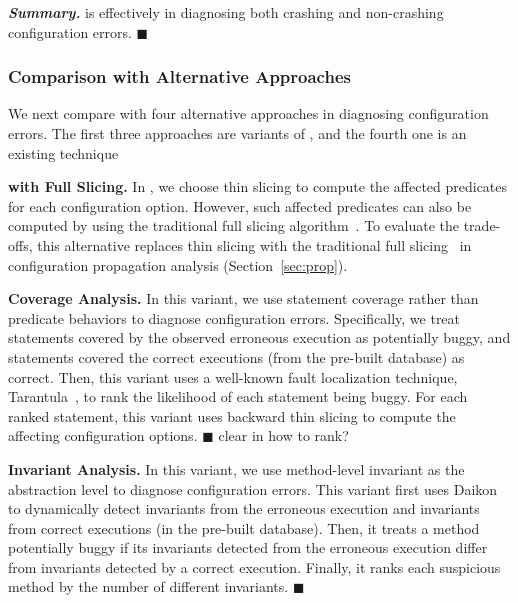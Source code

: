 \vspace{1mm}
\noindent \textbf{\textit{Summary.}} \ourtool is effectively
in diagnosing both crashing and non-crashing configuration errors. $\blacksquare$


\subsubsection{Comparison with Alternative Approaches}
\label{sec:comparison}

We next compare \ourtool with four alternative approaches
in diagnosing configuration errors.
The first three approaches are variants of \ourtool,
and the fourth one is an existing technique~\cite{Rabkin:2011:PPC}

\vspace{1mm}
\noindent \textbf{\ourtool with Full Slicing.} 
In \ourtool, we choose thin slicing to compute the affected predicates for
each configuration option. However, such affected predicates
can also be computed by using the traditional full slicing algorithm~\cite{Horwitz:1988}.
To evaluate the trade-offs, this alternative replaces
thin slicing with the traditional
full slicing~\cite{Horwitz:1988} in configuration
propagation analysis (Section~\ref{sec:prop}).

\vspace{1mm}
\noindent \textbf{Coverage Analysis.}
In this variant, we use statement coverage rather than
predicate behaviors to diagnose configuration errors. Specifically,
we treat statements covered by the observed erroneous execution as
potentially buggy, and statements covered the correct executions (from
the pre-built database) as correct. Then, this variant uses
a well-known fault localization technique, Tarantula~\cite{Jones:2002},
to rank the likelihood of each statement being buggy.
For each ranked statement, this variant uses backward thin slicing
to compute the affecting configuration options. $\blacksquare$ clear in
how to rank?


\vspace{1mm}
\noindent \textbf{Invariant Analysis.}
In this variant, we use method-level invariant as the abstraction level
to diagnose configuration errors. This variant first uses
Daikon~\cite{Ernst:1999} to dynamically
detect invariants from the erroneous execution  and invariants
from correct executions (in the pre-built database). Then, it
treats a method potentially buggy if its invariants detected
from the erroneous execution differ from invariants detected
by a correct execution. Finally, it ranks each suspicious
method by the number of different invariants. $\blacksquare$



